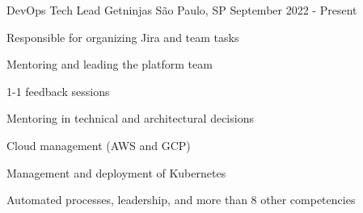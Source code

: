 

\begin{cventries}
\cventry
{DevOps Tech Lead} %
{Getninjas} %
{São Paulo, SP} %
{September 2022 - Present} %
{
  \begin{cvitems} %
   \item {Responsible for organizing Jira and team tasks}
   \item {Mentoring and leading the platform team}
   \item {1-1 feedback sessions}
   \item {Mentoring in technical and architectural decisions}
   \item {Cloud management (AWS and GCP)}
   \item {Management and deployment of Kubernetes}
   \item {Automated processes, leadership, and more than 8 other competencies}
  \end{cvitems}
}


\end{cventries}
